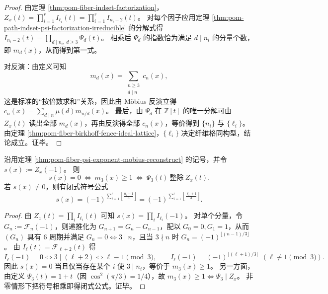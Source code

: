 \begin{proof}
由定理 \ref{thm:pom-fiber-indset-factorization}，
\(
Z_x(t)=\prod_{i=1}^r I_{\ell_i}(t)=\prod_{i=1}^r I_{n_i-2}(t)
\)。
对每个因子应用定理 \ref{thm:pom-path-indset-psi-factorization-irreducible} 的分解式得
\(
I_{n_i-2}(t)=\prod_{d\mid n_i,\ d\ge 3}\Psi_d(t)
\)。
相乘后 \(\Psi_d\) 的指数恰为满足 \(d\mid n_i\) 的分量个数，即 \(m_d(x)\)，从而得到第一式。

对反演：由定义可知
\[
m_d(x)=\sum_{\substack{n\ge 3\\ d\mid n}} c_n(x),
\]
这是标准的“按倍数求和”关系，因此由 Möbius 反演立得
\(
c_n(x)=\sum_{d\mid n}\mu(d)m_{n/d}(x)
\)。
最后，由 \(\Psi_d\) 在 \(\mathbb Z[t]\) 的唯一分解可由 \(Z_x(t)\) 读出全部 \(m_d(x)\)，再由反演得全部 \(c_n(x)\)，等价得到 \(\{n_i\}\) 与 \(\{\ell_i\}\)。
由定理 \ref{thm:pom-fiber-birkhoff-fence-ideal-lattice}，\(\{\ell_i\}\) 决定纤维格同构型，结论成立。证毕。
\end{proof}

\begin{corollary}\label{cor:pom-fiber-zx-minus-one-psi3-sign}
沿用定理 \ref{thm:pom-fiber-psi-exponent-mobius-reconstruct} 的记号，并令 \(s(x):=Z_x(-1)\)。
则
\[
s(x)=0\ \Longleftrightarrow\ m_3(x)\ge 1
\ \Longleftrightarrow\ \Psi_3(t)\ \text{整除}\ Z_x(t).
\]
若 \(s(x)\neq 0\)，则有闭式符号公式
\[
s(x)=(-1)^{\sum_{i=1}^r \left\lfloor\frac{n_i-1}{3}\right\rfloor}
=(-1)^{\sum_{i=1}^r \left\lfloor\frac{\ell_i+1}{3}\right\rfloor}.
\]
\end{corollary}

\begin{proof}
由 \(Z_x(t)=\prod_i I_{\ell_i}(t)\) 可知 \(s(x)=\prod_i I_{\ell_i}(-1)\)。
对单个分量，令 \(G_n:=\mathcal F_n(-1)\)，则递推化为
\(
G_{n+1}=G_n-G_{n-1}
\)，配以 \(G_0=0,G_1=1\)，从而 \((G_n)\) 具有 \(6\) 周期并满足
\(
G_n=0\iff 3\mid n
\)，且当 \(3\nmid n\) 时
\(
G_n=(-1)^{\lfloor (n-1)/3\rfloor}
\)。
由 \(I_\ell(t)=\mathcal F_{\ell+2}(t)\) 得
\[
I_\ell(-1)=0\iff 3\mid(\ell+2)\iff \ell\equiv 1\pmod 3,
\qquad
I_\ell(-1)=(-1)^{\lfloor(\ell+1)/3\rfloor}\ \ (\ell\not\equiv 1\!\!\!\pmod 3).
\]
因此 \(s(x)=0\) 当且仅当存在某个 \(i\) 使 \(3\mid n_i\)，等价于 \(m_3(x)\ge 1\)。
另一方面，由定义 \(\Psi_3(t)=1+t\)（因 \(\cos^2(\pi/3)=1/4\)），故
\(
m_3(x)\ge 1
\iff
\Psi_3\mid Z_x
\)。
非零情形下把符号相乘即得闭式公式。证毕。
\end{proof}

